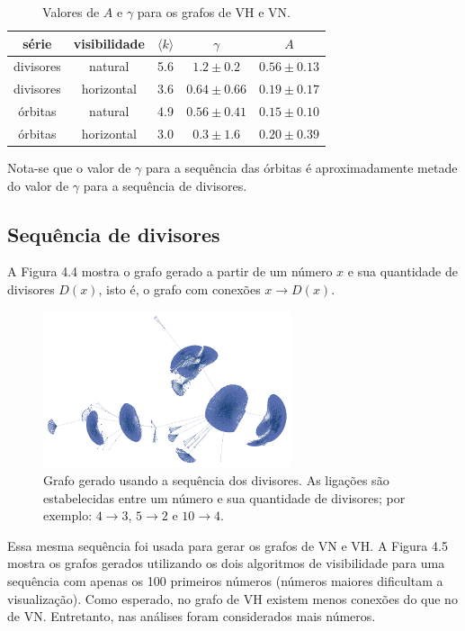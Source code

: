 \documentclass[12pt,a4paper,fleqn]{report}
\begin{document}
\begin{table}[H]
    \centering
    \caption{Valores de $A$ e $\gamma$ para os grafos de VH e VN.}
    \begin{tabular}{|c|c|c|c|c|}
        \hline série & visibilidade & $\langle k \rangle$ & $\gamma$ & $A$ \\
        \hline
        divisores & natural & 5.6 & $1.2 \pm 0.2$ & $0.56 \pm 0.13$ \\
        divisores & horizontal & 3.6 & $0.64 \pm 0.66$ & $0.19 \pm 0.17$ \\
        órbitas & natural & 4.9 & $0.56 \pm 0.41$ & $0.15 \pm 0.10$ \\
        órbitas & horizontal & 3.0 & $0.3 \pm 1.6$ & $0.20 \pm 0.39$ \\
         \hline 
    \end{tabular}
    \label{tab:div-orb}
\end{table}

Nota-se que o valor de $\gamma$ para a sequência das órbitas é aproximadamente metade
do valor de $\gamma$ para a sequência de divisores.

\subsection{Sequência de divisores}

A Figura 4.4 mostra o grafo gerado a partir de um número $x$ e sua quantidade de divisores $D(x)$, isto é, o grafo com conexões $x\to D(x)$.

\begin{figure}[H]
    \centering
    \includegraphics[width=0.65\textwidth]{article-2/divisors.pdf}
    \caption{Grafo gerado usando a sequência dos divisores. As ligações são estabelecidas entre um número
    e sua quantidade de divisores; por exemplo: $4\to 3$, $5\to 2$ e $10\to 4$.}
    \label{graph-divs}
\end{figure}

Essa mesma sequência foi usada para gerar os grafos de VN e VH. A Figura 4.5 mostra os grafos gerados utilizando os dois algoritmos de visibilidade para uma sequência com
apenas os 100 primeiros números  (números maiores dificultam a visualização). Como esperado, no grafo de VH existem menos conexões do que no de VN. Entretanto, nas análises foram considerados mais números.
\end{document}
